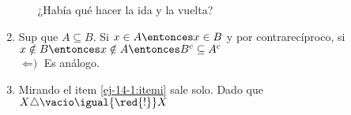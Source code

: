 \begin{enumerate}[label=\roman*)]
\begin{itemize}
                ¿Había qué hacer la ida y la vuelta? 
        \end{itemize}

  \item \text{$\Rightarrow$)} Sup que $A \subseteq B$. Si $x \in A \entonces x \in B$ y por contrarecíproco, si $x \notin B \entonces x \notin A \entonces B^c \subseteq A^c$ \\
        $\text{$\Leftarrow$)}$ Es análogo.

  \item Mirando el item \ref{ej-14-1:itemi} sale solo. Dado que $X \triangle \vacio \igual{\red{!}} X$
\end{enumerate}

\begin{aportes}
  \item {}
  \item {}
\end{aportes}
